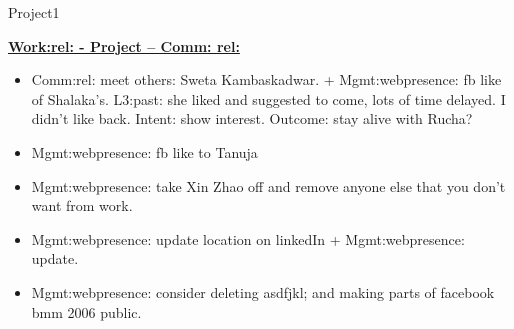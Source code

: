 \begin{columns}
\begin{column}{0.333\columnwidth}
\begin{block}{Project1}

\underline{\bf Work:rel: -  Project – Comm: rel:} 
\begin{itemize} 
\item \tiny Comm:rel: meet others:  Sweta Kambaskadwar. + Mgmt:webpresence: fb
like of Shalaka’s. L3:past: she liked and suggested to come, lots of
time delayed. I didn’t like back.  Intent: show interest. Outcome:
stay alive with Rucha?
\item \tiny Mgmt:webpresence: fb like to Tanuja
\item \tiny Mgmt:webpresence: take Xin Zhao off and remove anyone else that you
don’t want from work.
\item \tiny Mgmt:webpresence: update location on linkedIn +  Mgmt:webpresence: update.
\item \tiny Mgmt:webpresence: consider deleting asdfjkl;  and making parts of facebook bmm 2006 public. 
\end{itemize}

\end{block}




\end{column}
\end{columns}
